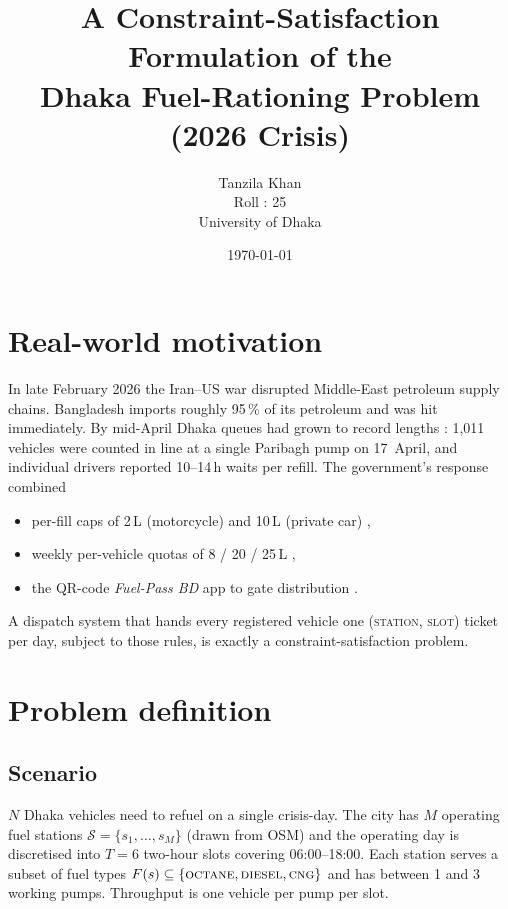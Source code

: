 \documentclass[11pt,a4paper]{article}
\title{\bfseries A Constraint-Satisfaction Formulation of the\\
       Dhaka Fuel-Rationing Problem (2026 Crisis)}
\author{Tanzila Khan \\ Roll : 25 \\ University of Dhaka}
\date{\today}
\begin{document}
\maketitle


\section{Real-world motivation}

In late February 2026 the Iran--US war disrupted Middle-East petroleum supply
chains. Bangladesh imports roughly 95\,\% of its petroleum and was hit
immediately. By mid-April Dhaka queues had grown to record lengths
\cite{prothomalo1011,kuwait,aa}: 1{,}011 vehicles were counted in line at a
single Paribagh pump on 17~April, and individual drivers reported 10--14\,h
waits per refill. The government's response combined
\begin{itemize}[noitemsep,topsep=2pt]
  \item per-fill caps of 2\,L (motorcycle) and 10\,L (private car)
        \cite{bsslimit},
  \item weekly per-vehicle quotas of 8 / 20 / 25\,L
        \cite{bssweekly},
  \item the QR-code \emph{Fuel-Pass BD} app to gate distribution
        \cite{tbsapp,fuelpass2pumps,fuelpass7}.
\end{itemize}

A dispatch system that hands every registered vehicle one
\textsc{(station, slot)} ticket per day, subject to those rules, is exactly a
constraint-satisfaction problem.

\section{Problem definition}

\subsection{Scenario}
$N$ Dhaka vehicles need to refuel on a single crisis-day. The city has $M$
operating fuel stations $\mathcal{S}=\{s_1,\dots,s_M\}$ (drawn from OSM) and
the operating day is discretised into $T{=}6$ two-hour slots covering
06:00--18:00. Each station serves a subset of fuel types
$F(s)\subseteq\{\textsc{octane},\textsc{diesel},\textsc{cng}\}$ and has
between 1 and 3 working pumps. Throughput is one vehicle per pump per slot.
\end{document}
